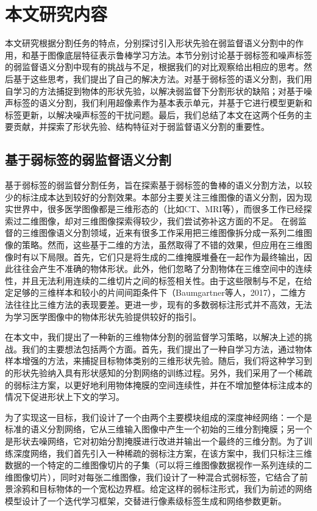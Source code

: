 \section{本文研究内容}
本文研究根据分割任务的特点，分别探讨引入形状先验在弱监督语义分割中的作用，和基于图像底层特征表示鲁棒学习方法。本节分别讨论基于弱标签和噪声标签的弱监督语义分割中现有的挑战与不足，根据我们的对比观察给出相应的思考。然后基于这些思考，我们提出了自己的解决方法。对基于弱标签的语义分割，我们用自学习的方法捕捉到物体的形状先验，以解决弱监督下分割形状的缺陷；对基于噪声标签的语义分割，我们利用超像素作为基本表示单元，并基于它进行模型更新和标签更新，以解决噪声标签的干扰问题。最后，我们总结了本文在这两个任务的主要贡献，并探索了形状先验、结构特征对于弱监督语义分割的重要性。

\subsection{基于弱标签的弱监督语义分割}
基于弱标签的弱监督分割任务，旨在探索基于弱标签的鲁棒的语义分割方法，以较少的标注成本达到较好的分割效果。本部分主要关注三维图像的语义分割，因为现实世界中，很多医学图像都是三维形态的（比如CT、MRI等），而很多工作已经探索过二维图像，却对三维图像探索得较少，我们尝试弥补这方面的不足。
在弱监督的三维图像语义分割领域，近来有很多工作采用把三维图像拆分成一系列二维图像的策略。然而，这些基于二维的方法，虽然取得了不错的效果，但应用在三维图像时有以下局限。首先，它们只是将生成的二维掩膜堆叠在一起作为最终输出，因此往往会产生不准确的物体形状\citep{kervadec2019constrained,kervadec2020bounding}。此外，他们忽略了分割物体在三维空间中的连续性，并且无法利用连续的二维切片之间的标签相关性。由于这些限制与不足，在给定足够的三维样本和较小的片间间距条件下（Baumgartner等人，2017），二维方法往往比三维方法的表现要差。更进一步，现有的多数弱标注形式并不高效，无法为学习医学图像中的物体形状先验提供较好的指引。

在本文中，我们提出了一种新的三维物体分割的弱监督学习策略，以解决上述的挑战。我们的主要想法包括两个方面。首先，我们提出了一种自学习方法，通过物体样本增强的方法，来捕捉目标物体类别的三维形状先验。随后，我们将这种学习到的形状先验纳入具有形状感知的分割网络的训练过程。另外，我们采用了一个稀疏的弱标注方案，以更好地利用物体掩膜的空间连续性，并在不增加整体标注成本的情况下促进形状上下文的学习。

为了实现这一目标，我们设计了一个由两个主要模块组成的深度神经网络：一个是标准的语义分割网络，它从三维输入图像中产生一个初始的三维分割掩膜；另一个是形状去噪网络，它对初始分割掩膜进行改进并输出一个最终的三维分割。为了训练深度网络，我们首先引入一种稀疏的弱标注方案，在该方案中，我们只标注三维数据的一个特定的二维图像切片的子集（可以将三维图像数据视作一系列连续的二维图像切片），同时对每张二维图像，我们设计了一种混合式弱标签，它结合了前景涂鸦和目标物体的一个宽松边界框。给定这样的弱标注形式，我们为前述的网络模型设计了一个迭代学习框架，交替进行像素级标签生成和网络参数更新。

